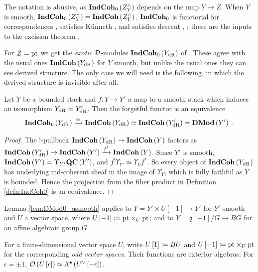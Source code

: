 The notation is abusive, as $\mathbf{IndCoh}_0\left(Z^\wedge_Y\right)$ depends on the map $Y\to Z$.
When $Y$ is smooth, $\mathbf{IndCoh}_0\left(Z^\wedge_Y\right) = \mathbf{IndCoh}\left(Z^\wedge_Y\right)$.
$\mathbf{IndCoh}_0$ is functorial for correspondences \cite[Theorem 3.3.3]{Ber:center}, satisfies
K\"unneth \cite[Section 3.4]{Ber:center}, and satisfies descent \cite[Proposition 4.4.1]{Ber:center}, \cite[Proposition 2.3.6]{HoLi};
these are the inputs to the excision theorem \cite[Theorem 3.3.1]{HoLi}.

For $Z = \text{pt}$ we get the \emph{exotic} $\mathcal{D}$-modules $\mathbf{IndCoh}_0\left(Y_{\text{dR}}\right)$ of
\cite{Ber:center}. These agree with the usual ones $\mathbf{IndCoh}\left(Y_{\text{dR}}\right)$ for $Y$
smooth, but unlike the usual ones they can see derived structure.
The only case we will need is the following, in which the derived structure is invisible
after all.

\begin{lem}
\label{lem:DMod0_qsmooth}
Let $Y$ be a bounded stack and $f\colon Y\to Y'$ a map to a smooth stack which
induces an isomorphism $Y_{\text{dR}}\simeq Y'_{\text{dR}}$. Then the forgetful functor is an equivalence
\begin{equation*}
\mathbf{IndCoh}_0\left(Y_{\text{dR}}\right) \xrightarrow{\simeq} \mathbf{IndCoh}\left(Y_{\text{dR}}\right)\simeq
\mathbf{IndCoh}\left(Y'_{\text{dR}}\right) = \mathbf{DMod}\left(Y'\right) \ .
\end{equation*}
\end{lem}

\begin{proof}
The $!$-pullback $\mathbf{IndCoh}\left(Y_{\text{dR}}\right)\to\mathbf{IndCoh}\left(Y\right)$ factors as
$\mathbf{IndCoh}\left(Y'_{\text{dR}}\right)\to\mathbf{IndCoh}\left(Y'\right)\xrightarrow{f^!}\mathbf{IndCoh}\left(Y\right)$.
Since $Y'$ is smooth, $\mathbf{IndCoh}\left(Y'\right) = \Upsilon_{Y'}\mathbf{QC}\left(Y'\right)$, and
$f^!\Upsilon_{Y'}\simeq\Upsilon_Y f^*$.
So every object of $\mathbf{IndCoh}\left(Y_{\text{dR}}\right)$ has underlying ind-coherent sheaf in the
image of $\Upsilon_Y$, which is fully faithful as $Y$ is bounded. Hence the
projection from the fiber product in Definition \ref{defn:IndCoh0} is an equivalence.
\end{proof}

\begin{exm}
\label{exm:DMod0_qsmooth}
Lemma \ref{lem:DMod0_qsmooth} applies to $Y = Y'\times U\left[-1\right]\to Y'$ for
$Y'$ smooth and $U$ a vector space, where $U\left[-1\right]\coloneqq\text{pt}\times_U\text{pt}$; and to
$Y = \mathfrak{g}\left[-1\right]/G\to BG$ for an affine algebraic group $G$.
\end{exm}

For a finite-dimensional vector space $U$, write $U\left[1\right]\coloneqq BU$ and
$U\left[-1\right]\coloneqq\text{pt}\times_U\text{pt}$ for the corresponding \emph{odd vector spaces}. Their
functions are exterior algebras: For $\epsilon=\pm1$,
$\mathcal{O}\left(U\left[\epsilon\right]\right)\simeq\Lambda^\bullet\left(U^\vee\left[-\epsilon\right]\right)$.

